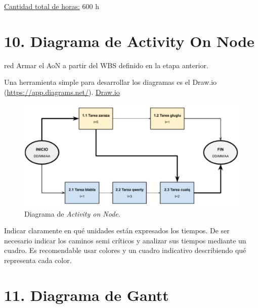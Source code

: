 \documentclass[
11pt, %
]{charter}
\begin{document}
\underline{Cantidad total de horas:} 600 h

\section{10. Diagrama de Activity On Node}
\label{sec:AoN}

\begin{consigna}{red}
  Armar el AoN a partir del WBS definido en la etapa anterior.

  Una herramienta simple para desarrollar los diagramas es el Draw.io (\url{https://app.diagrams.net/}).
  \href{https://app.diagrams.net}{Draw.io}


  \begin{figure}[htpb]
    \centering
    \includegraphics[width=.8\textwidth]{./Figuras/AoN.png}
    \caption{Diagrama de \textit{Activity on Node}.}
    \label{fig:AoN}
  \end{figure}

  Indicar claramente en qué unidades están expresados los tiempos.
  De ser necesario indicar los caminos semi críticos y analizar sus tiempos mediante un cuadro.
  Es recomendable usar colores y un cuadro indicativo describiendo qué representa cada color.

\end{consigna}

\section{11. Diagrama de Gantt}
\label{sec:gantt}
\end{document}
